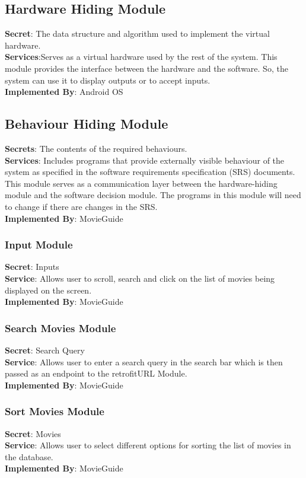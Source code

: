 \documentclass[12pt, titlepage]{article}
\begin{document}
	\subsection{Hardware Hiding Module}
	\textbf{Secret}: The data structure and algorithm used to implement the virtual hardware.\\
	\textbf{Services}:Serves as a virtual hardware used by the rest of the system. This module provides the interface between the hardware and the software. So, the system can use it to display outputs or to accept inputs. \\
	\textbf{Implemented By}: Android OS
	
	\subsection{Behaviour Hiding Module}
	\textbf{Secrets}: The contents of the required behaviours. \\
	\textbf{Services}: Includes programs that provide externally visible behaviour of the system as specified in the software requirements specification (SRS) documents. This module serves as a communication layer between the hardware-hiding module and the software decision module. The programs in this module will need to change if there are changes in the SRS.\\
	\textbf{Implemented By}: MovieGuide \\
	\subsubsection{Input Module}
	\textbf{Secret}:  Inputs \\
	\textbf{Service}: Allows user to scroll, search and click on the list of movies being displayed on the screen.   \\  
	\textbf{Implemented By}: MovieGuide \\
	\subsubsection{Search Movies Module}
	\textbf{Secret}: Search Query\\
	\textbf{Service}: Allows user to enter a search query in the search bar which is then passed as an endpoint to the retrofitURL Module. \\
	\textbf{Implemented By}: MovieGuide\\
	\subsubsection{Sort Movies Module}
	\textbf{Secret}: Movies \\
	\textbf{Service}: Allows user to select different options for sorting the list of movies in the database. \\
	\textbf{Implemented By}: MovieGuide\\ 
\end{document}
